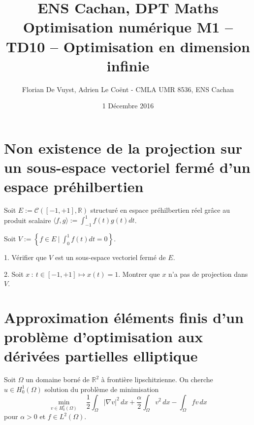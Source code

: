 \documentclass[11pt, a4paper]{article}
\title{ENS Cachan, DPT Maths \\ [1cm]
Optimisation numérique M1 -- TD10 -- Optimisation en dimension infinie}
\date{1 Décembre 2016}
\author{Florian De Vuyst, Adrien Le Co\"ent - CMLA UMR 8536, ENS Cachan}
\begin{document}
%
\maketitle
%
\section*{Non existence de la projection sur un sous-espace vectoriel fermé d'un espace préhilbertien}
%
Soit $E:= \mathcal{C}([-1,+1],\mathbb{R})$ structuré en espace préhilbertien réel 
grâce au produit scalaire $\langle f,g \rangle := \int_{-1}^1 f(t)g(t)dt$.

Soit $V:= \left \lbrace f \in E \ | \ \int_0^1 f(t)dt = 0 \right \rbrace$.

1. Vérifier que $V$ est un sous-espace vectoriel fermé de $E$.

2. Soit $x \ : \ t \in [-1,+1 ] \longmapsto x(t) = 1$. Montrer que $x$ n'a pas de 
projection dans $V$.
%
\section*{Approximation éléments finis d’un problème d’optimisation aux
dérivées partielles elliptique}
%

Soit $\Omega$ un domaine borné de $\mathbb{R}^2$ à frontière lipschitzienne. On cherche
$u\in H^1_0(\Omega)$ solution du problème de minimisation
\[
\min_{v\in H^1_0(\Omega)}\quad \frac{1}{2}\int_\Omega |\nabla v|^2\, dx
+ \dfrac{\alpha}{2} \int_\Omega v^2\, dx - \int_\Omega f v\, dx
\]
pour $\alpha>0$ et $f\in L^2(\Omega)$.
\end{document}
